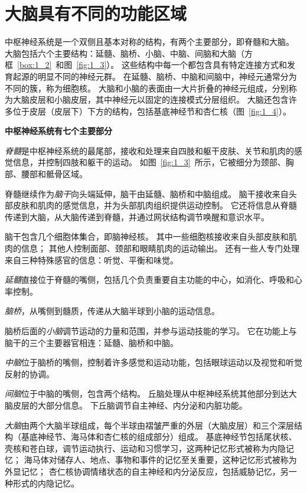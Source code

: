 \section{大脑具有不同的功能区域}

中枢神经系统是一个双侧且基本对称的结构，有两个主要部分，即脊髓和大脑。
大脑包括六个主要结构：延髓、脑桥、小脑、中脑、间脑和大脑（方框~\ref{box:1_2}~和图~\ref{fig:1_3}）。
这些结构中每一个都包含具有特定连接方式和发育起源的明显不同的神经元群。
在延髓、脑桥、中脑和间脑中，神经元通常分为不同的簇，称为细胞核。
大脑和小脑的表面由一大片折叠的神经元组成，分别称为大脑皮层和小脑皮层，其中神经元以固定的连接模式分层组织。
大脑还包含许多位于皮层（皮层下）下方的结构，包括基底神经节和杏仁核（图~\ref{fig:1_4}）。


\begin{proposition}[中枢神经系统的解剖学组织] \label{box:1_2}
	\textbf{中枢神经系统有七个主要部分}
	
	\quad \quad \textit{脊髓}是中枢神经系统的最尾部，接收和处理来自四肢和躯干皮肤、关节和肌肉的感觉信息，并控制四肢和躯干的运动。
	如图~\ref{fig:1_3}~所示，它被细分为颈部、胸部、腰部和骶骨区域。
	
	\quad \quad 脊髓继续作为\textit{脑干}向头端延伸，脑干由延髓、脑桥和中脑组成。
	脑干接收来自头部皮肤和肌肉的感觉信息，并为头部肌肉组织提供运动控制。
	它还将信息从脊髓传递到大脑，从大脑传递到脊髓，并通过网状结构调节唤醒和意识水平。
	
	\quad \quad 脑干包含几个细胞体集合，即脑神经核。
	其中一些细胞核接收来自头部皮肤和肌肉的信息；
	其他人控制面部、颈部和眼睛肌肉的运动输出。
	还有一些人专门处理来自三种特殊感官的信息：听觉、平衡和味觉。
	
	\quad \quad \textit{延髓}直接位于脊髓的嘴侧，包括几个负责重要自主功能的中心，如消化、呼吸和心率控制。
	
	\quad \quad \textit{脑桥}，从嘴侧到髓质，传递从大脑半球到小脑的运动信息。
	
	\quad \quad 脑桥后面的\textit{小脑}调节运动的力量和范围，并参与运动技能的学习。
	它在功能上与脑干的三个主要器官相连：延髓、脑桥和中脑。
	
	\quad \quad \textit{中脑}位于脑桥的嘴侧，控制着许多感觉和运动功能，包括眼球运动以及视觉和听觉反射的协调。
	
	\quad \quad \textit{间脑}位于中脑的嘴侧，包含两个结构。
	丘脑处理从中枢神经系统其他部分到达大脑皮层的大部分信息。
	下丘脑调节自主神经、内分泌和内脏功能。
	
	\quad \quad \textit{大脑}由两个大脑半球组成，每个半球由褶皱严重的外层（大脑皮层）和三个深层结构（基底神经节、海马体和杏仁核的组成部分）组成。
	基底神经节包括尾状核、壳核和苍白球，调节运动执行、运动和习惯学习，这两种记忆形式被称为内隐记忆；
	海马体对储存人、地点、事物和事件的记忆至关重要，这种记忆形式被称为外显记忆；
	杏仁核协调情绪状态的自主神经和内分泌反应，包括威胁记忆，另一种形式的内隐记忆。
	

\end{proposition}
